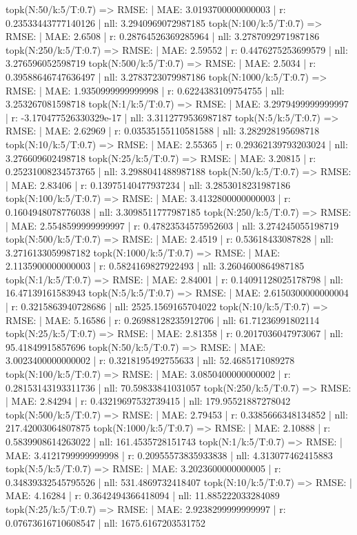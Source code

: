 topk(N:50/k:5/T:0.7) => RMSE: | MAE: 3.0193700000000003 | r: 0.23533443777140126 | nll: 3.2940969072987185
topk(N:100/k:5/T:0.7) => RMSE: | MAE: 2.6508 | r: 0.28764526369285964 | nll: 3.2787092971987186
topk(N:250/k:5/T:0.7) => RMSE: | MAE: 2.59552 | r: 0.4476275253699579 | nll: 3.276596052598719
topk(N:500/k:5/T:0.7) => RMSE: | MAE: 2.5034 | r: 0.39588646747636497 | nll: 3.2783723079987186
topk(N:1000/k:5/T:0.7) => RMSE: | MAE: 1.9350999999999998 | r: 0.6224383109754755 | nll: 3.253267081598718
topk(N:1/k:5/T:0.7) => RMSE: | MAE: 3.2979499999999997 | r: -3.170477526330329e-17 | nll: 3.3112779536987187
topk(N:5/k:5/T:0.7) => RMSE: | MAE: 2.62969 | r: 0.03535155110581588 | nll: 3.282928195698718
topk(N:10/k:5/T:0.7) => RMSE: | MAE: 2.55365 | r: 0.29362139793203024 | nll: 3.276609602498718
topk(N:25/k:5/T:0.7) => RMSE: | MAE: 3.20815 | r: 0.25231008234573765 | nll: 3.2988041488987188
topk(N:50/k:5/T:0.7) => RMSE: | MAE: 2.83406 | r: 0.13975140477937234 | nll: 3.2853018231987186
topk(N:100/k:5/T:0.7) => RMSE: | MAE: 3.4132800000000003 | r: 0.1604948078776038 | nll: 3.3098511777987185
topk(N:250/k:5/T:0.7) => RMSE: | MAE: 2.5548599999999997 | r: 0.47823534575952603 | nll: 3.274245055198719
topk(N:500/k:5/T:0.7) => RMSE: | MAE: 2.4519 | r: 0.53618433087828 | nll: 3.2716133059987182
topk(N:1000/k:5/T:0.7) => RMSE: | MAE: 2.1135900000000003 | r: 0.5824169827922493 | nll: 3.2604600864987185
topk(N:1/k:5/T:0.7) => RMSE: | MAE: 2.84001 | r: 0.14091128025178798 | nll: 16.47139161583943
topk(N:5/k:5/T:0.7) => RMSE: | MAE: 2.6150300000000004 | r: 0.3215863940728686 | nll: 2525.1569165704022
topk(N:10/k:5/T:0.7) => RMSE: | MAE: 5.16586 | r: 0.26988128235912706 | nll: 61.71236991802114
topk(N:25/k:5/T:0.7) => RMSE: | MAE: 2.81358 | r: 0.2017036047973067 | nll: 95.41849915857696
topk(N:50/k:5/T:0.7) => RMSE: | MAE: 3.0023400000000002 | r: 0.3218195492755633 | nll: 52.4685171089278
topk(N:100/k:5/T:0.7) => RMSE: | MAE: 3.0850400000000002 | r: 0.28153143193311736 | nll: 70.59833841031057
topk(N:250/k:5/T:0.7) => RMSE: | MAE: 2.84294 | r: 0.43219697532739415 | nll: 179.95521887278042
topk(N:500/k:5/T:0.7) => RMSE: | MAE: 2.79453 | r: 0.3385666348134852 | nll: 217.42003064807875
topk(N:1000/k:5/T:0.7) => RMSE: | MAE: 2.10888 | r: 0.5839908614263022 | nll: 161.4535728151743
topk(N:1/k:5/T:0.7) => RMSE: | MAE: 3.4121799999999998 | r: 0.20955573835933838 | nll: 4.313077462415883
topk(N:5/k:5/T:0.7) => RMSE: | MAE: 3.2023600000000005 | r: 0.34839332545795526 | nll: 531.4869732418407
topk(N:10/k:5/T:0.7) => RMSE: | MAE: 4.16284 | r: 0.3642494366418094 | nll: 11.885222033284089
topk(N:25/k:5/T:0.7) => RMSE: | MAE: 2.9238299999999997 | r: 0.07673616710608547 | nll: 1675.6167203531752
